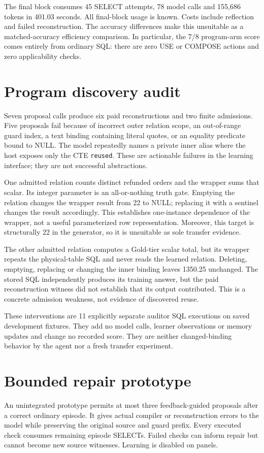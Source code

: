 \documentclass[10pt,twocolumn]{article}
\begin{document}
The final block consumes 45 SELECT attempts, 78 model calls and 155,686 tokens
in 401.03 seconds. All final-block usage is known. Costs include reflection and
failed reconstruction. The accuracy differences make this unsuitable as a
matched-accuracy efficiency comparison. In particular, the 7/8 program-arm score
comes entirely from ordinary SQL: there are zero USE or COMPOSE actions and
zero applicability checks.

\section{Program discovery audit}
Seven proposal calls produce six paid reconstructions and two finite admissions.
Five proposals fail because of incorrect outer relation scope, an out-of-range
guard index, a text binding containing literal quotes, or an equality predicate
bound to NULL. The model repeatedly names a private inner alias where the host
exposes only the CTE \texttt{reused}. These are actionable failures in the
learning interface; they are not successful abstractions.

One admitted relation counts distinct refunded orders and the wrapper sums that
scalar. Its integer parameter is an all-or-nothing truth gate. Emptying the
relation changes the wrapper result from 22 to NULL; replacing it with a sentinel
changes the result accordingly. This establishes one-instance dependence of the
wrapper, not a useful parameterized row representation. Moreover, this target
is structurally 22 in the generator, so it is unsuitable as sole transfer evidence.

The other admitted relation computes a Gold-tier scalar total, but its wrapper
repeats the physical-table SQL and never reads the learned relation. Deleting,
emptying, replacing or changing the inner binding leaves 1350.25 unchanged.
The stored SQL independently produces its training answer, but the paid
reconstruction witness did not establish that its output contributed.
This is a concrete admission weakness, not evidence of discovered reuse.

These interventions are 11 explicitly separate auditor SQL executions on saved
development fixtures. They add no model calls, learner observations or memory
updates and change no recorded score. They are neither changed-binding behavior
by the agent nor a fresh transfer experiment.

\section{Bounded repair prototype}
An unintegrated prototype permits at most three feedback-guided proposals after
a correct ordinary episode. It gives actual compiler or reconstruction errors
to the model while preserving the original source and guard prefix. Every
executed check consumes remaining episode SELECTs. Failed checks can inform
repair but cannot become new source witnesses. Learning is disabled on panels.
\end{document}
